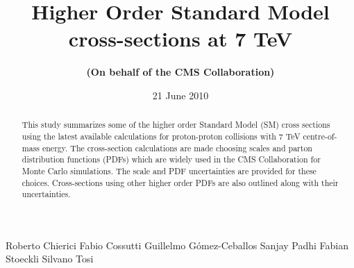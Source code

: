 \documentclass{cmspaper_pdf}
\begin{document}

\begin{titlepage}

  \date{21 June 2010}

  \title{Higher Order Standard Model \\
         cross-sections at 7 TeV}

  \begin{Authlist}
     Roberto Chierici
    Fabio Cossutti 
    Guillelmo G\'omez-Ceballos 
    Sanjay Padhi
    Fabian Stoeckli
    Silvano Tosi

  \end{Authlist}

  \author{\bf(On behalf of the CMS Collaboration)}

  \begin{abstract}
This study summarizes some of the higher order Standard Model (SM) cross sections using the latest 
available calculations for proton-proton collisions with 7 TeV centre-of-mass 
energy. The cross-section calculations are made choosing scales and 
parton distribution functions (PDFs) which are widely used in the CMS Collaboration for Monte 
Carlo simulations. The scale and PDF uncertainties are provided 
for these choices. Cross-sections using other higher order PDFs are also 
outlined along with their uncertainties.
  \end{abstract}

\end{titlepage}

\setcounter{page}{2}%

%





\end{document}
